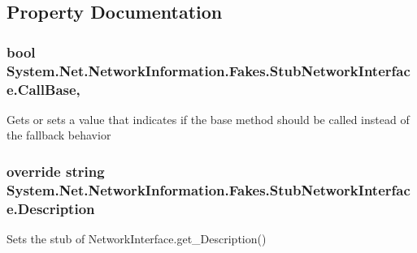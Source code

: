 \subsection{Property Documentation}
\hypertarget{class_system_1_1_net_1_1_network_information_1_1_fakes_1_1_stub_network_interface_a72ee01085fb7801622f450aec7d96555}{
\subsubsection[{Call\-Base}]{\setlength{\rightskip}{0pt plus 5cm}bool System.\-Net.\-Network\-Information.\-Fakes.\-Stub\-Network\-Interface.\-Call\-Base\hspace{0.3cm}{\ttfamily [get]}, {\ttfamily [set]}}}\label{class_system_1_1_net_1_1_network_information_1_1_fakes_1_1_stub_network_interface_a72ee01085fb7801622f450aec7d96555}


Gets or sets a value that indicates if the base method should be called instead of the fallback behavior

\hypertarget{class_system_1_1_net_1_1_network_information_1_1_fakes_1_1_stub_network_interface_a34d03e6600ff7e2eab3fdac75e97990c}{
\subsubsection[{Description}]{\setlength{\rightskip}{0pt plus 5cm}override string System.\-Net.\-Network\-Information.\-Fakes.\-Stub\-Network\-Interface.\-Description\hspace{0.3cm}{\ttfamily [get]}}}\label{class_system_1_1_net_1_1_network_information_1_1_fakes_1_1_stub_network_interface_a34d03e6600ff7e2eab3fdac75e97990c}


Sets the stub of Network\-Interface.\-get\-\_\-\-Description()

